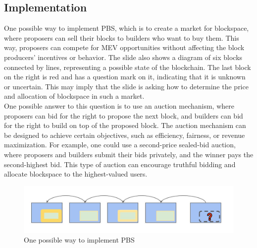 \subsection{Implementation}
One possible way to implement PBS, which is to create a market for blockspace, where proposers can sell their blocks to builders who want to buy them. This way, proposers can compete for MEV opportunities without affecting the block producers’ incentives or behavior. The slide also shows a diagram of six blocks connected by lines, representing a possible state of the blockchain. The last block on the right is red and has a question mark on it, indicating that it is unknown or uncertain. This may imply that the slide is asking how to determine the price and allocation of blockspace in such a market.\\
One possible answer to this question is to use an auction mechanism, where proposers can bid for the right to propose the next block, and builders can bid for the right to build on top of the proposed block. The auction mechanism can be designed to achieve certain objectives, such as efficiency, fairness, or revenue maximization. For example, one could use a second-price sealed-bid auction, where proposers and builders submit their bids privately, and the winner pays the second-highest bid. This type of auction can encourage truthful bidding and allocate blockspace to the highest-valued users.
\begin{center}
	\begin{figure}
		\centering
		\includegraphics[width=0.8\linewidth]{Fig/22/F3}
		\caption{One possible way to implement PBS}
		\label{fig:L22_f3}
	\end{figure}
\end{center}
